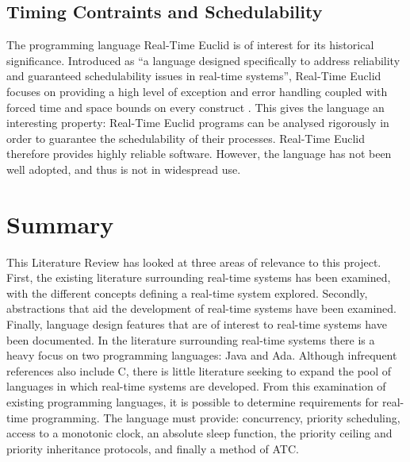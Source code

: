 \subsection{Timing Contraints and Schedulability} 
The programming language Real-Time Euclid is of interest for its historical 
significance. Introduced as ``a language designed specifically to address reliability 
and guaranteed schedulability issues in real-time systems'', Real-Time Euclid 
focuses on providing a high level of exception and error handling coupled with 
forced time and space bounds on every construct \cite{real-time-euclid}. This 
gives the language an interesting property: Real-Time Euclid programs can
be analysed rigorously in order to guarantee the schedulability of their 
processes. Real-Time Euclid therefore provides highly reliable software. 
However, the language has not been well adopted, and thus is not in widespread use. 

\section{Summary}
This Literature Review has looked at three areas of relevance to this project.
First, the existing literature surrounding real-time systems has been examined,
with the different concepts defining a real-time system explored. Secondly,
abstractions that aid the development of real-time systems have been examined.
Finally, language design features that are of interest to real-time systems
have been documented. In the literature surrounding real-time systems there is a heavy focus on two
programming languages: Java and Ada. Although infrequent references also include C, 
there is little literature seeking to expand the pool of languages in which 
real-time systems are developed. From this examination of existing programming 
languages, it is possible to determine requirements for real-time programming. 
The language must provide: concurrency, priority scheduling, access to a monotonic 
clock, an absolute sleep function, the priority ceiling and priority inheritance 
protocols, and finally a method of ATC. 
